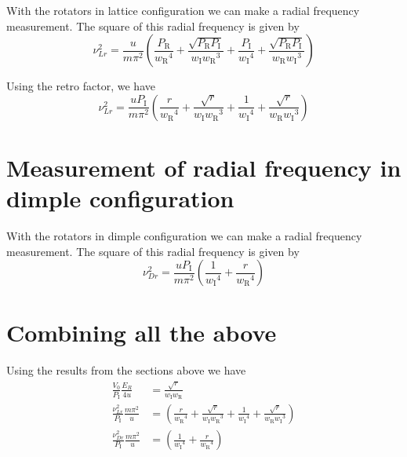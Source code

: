 \documentclass[11pt,letter]{article}
\newcommand{\pin}{\ensuremath{ P_{\text{I}}} }
\newcommand{\pret}{\ensuremath{ P_{\text{R}}} }
\newcommand{\win}{\ensuremath{ w_{\text{I}}} }
\newcommand{\wret}{\ensuremath{ w_{\text{R}}} }
\begin{document}
With the rotators in lattice configuration we can make a radial frequency
measurement.    The square of this radial frequency is given by
\begin{equation}
  \nu_{Lr}^{2} =  \frac{ u }{ m \pi^{2}  }  
   \left( \frac{\pret}{\wret^{4} }
      + \frac{ \sqrt{ \pret \pin }}{ \win \wret^{3}} 
      +  \frac{\pin}{\win^{4}}
      + \frac{ \sqrt{ \pret \pin }}{ \wret \win^{3} }
   \right) 
\end{equation}

Using the retro factor, we have 
\begin{equation}
  \nu_{Lr}^{2} =  \frac{ u \pin }{ m \pi^{2}  }  
   \left( \frac{r}{\wret^{4} }
      + \frac{ \sqrt{ r }}{ \win \wret^{3}} 
      +  \frac{1}{\win^{4}}
      + \frac{ \sqrt{ r }}{ \wret \win^{3} }
   \right) 
\end{equation}

\section{Measurement of radial frequency in dimple configuration}

With the rotators in dimple configuration we can make a radial frequency
measurement.  The square of this radial frequency is given by 
\begin{equation} 
   \nu_{Dr}^{2} = \frac{ u \pin }{ m \pi^{2} } \left( 
     \frac{ 1 }{ \win^{4} } + \frac{ r }{ \wret^{4} } 
    \right)
\end{equation} 

\section{Combining all the above}  

Using the results from the sections above we have 
\begin{equation}
\begin{split} 
 \frac{V_{0}}{\pin}    \frac{E_{R}}{4u} & = \frac{ \sqrt{  r } }{ \win \wret}  \\
 \frac{\nu_{Lr}^{2}}{\pin}   \frac{ m \pi^{2}  }{ u }  &  =
   \left( \frac{r}{\wret^{4} }
      + \frac{ \sqrt{ r }}{ \win \wret^{3}} 
      +  \frac{1}{\win^{4}}
      + \frac{ \sqrt{ r }}{ \wret \win^{3} }
   \right) \\  
 \frac{ \nu_{Dr}^{2}}{\pin} \frac{ m \pi^{2} }{ u  } &  = 
   \left(  
     \frac{ 1 }{ \win^{4} } + \frac{ r }{ \wret^{4} } 
    \right)
\end{split}
\end{equation}
\end{document}
